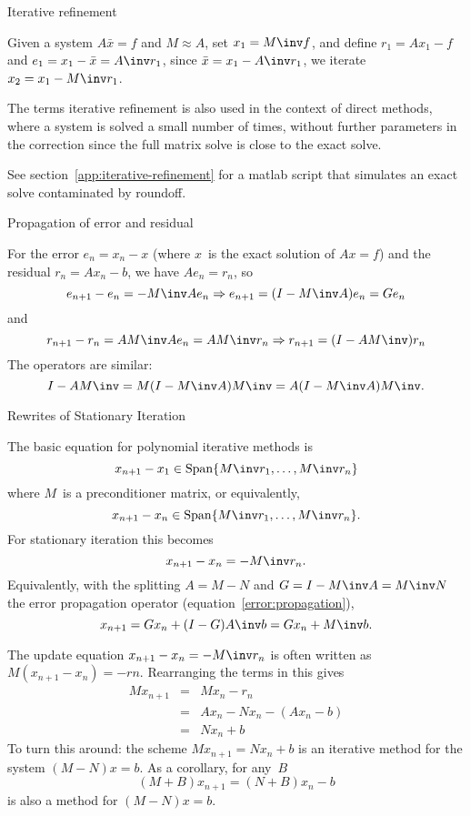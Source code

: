  {Iterative refinement}

Given a system $A\bar x=f$ and $M\approx A$,
set $x_1=M\inv f$, and define $r_1=Ax_1-f$ and $e_1=x_1-\bar x=A\inv r_1$,
since $\bar x=x_1-A\inv r_1$, we iterate $x_2=x_1-M\inv r_1$.

The terms iterative refinement is also used in the context of direct 
methods, where a system is solved a small number of times,
without further parameters in the correction since the full matrix
solve is close to the exact solve.

\begin{notes}
See section~\ref{app:iterative-refinement} for a matlab script that simulates 
an exact solve contaminated by roundoff.
\end{notes}

 {Propagation of error and residual}

For the error $e_n=x_n-x$ (where $x$~is the exact
solution of $Ax=f$) and the residual $r_n=Ax_n-b$,
we have $Ae_n=r_n$, so
\begin{equation}
	e_{n+1}-e_n=-M\inv Ae_n \Rightarrow e_{n+1}=(I-M\inv A)e_n=Ge_n
	\label{error:propagation}\end{equation}
and
\begin{equation}
	r_{n+1}-r_n=AM\inv Ae_n=AM\inv r_n \Rightarrow r_{n+1}=(I-AM\inv)r_n
	\label{residual:propagation}\end{equation}
The operators are similar:
\[ I-AM\inv = M(I-M\inv A)M\inv = A(I-M\inv A)M\inv. \]

 {Rewrites of Stationary Iteration}

The basic equation for polynomial iterative methods is
\[ x_{n+1}-x_1\in {\rm Span}\{M\inv r_1,\ldots,M\inv r_n\} \]
where $M$~is a preconditioner matrix, or equivalently,
\[ x_{n+1}-x_n\in {\rm Span}\{M\inv r_1,\ldots,M\inv r_n\}. \]
For stationary iteration this becomes
\[ x_{n+1}-x_n=-M\inv r_n. \]
Equivalently, with the splitting $A=M-N$ and
$G=I-M\inv A=M\inv N$ the error propagation operator 
(equation~\ref{error:propagation}),
\[ x_{n+1}=Gx_n+(I-G)A\inv b=Gx_n+M\inv b.\]

The update equation $x_{n+1}-x_n=-M\inv r_n$ is often written as
$M(x_{n+1}-x_n)=-rn$. Rearranging the terms in this gives
\begin{eqnarray*}
 Mx_{n+1}&=&Mx_n-r_n\\
         &=&Ax_n-Nx_n-(Ax_n-b)\\
         &=&Nx_n+b
\end{eqnarray*}
To turn this around: the scheme $Mx_{n+1}=Nx_n+b$ is an iterative
method for the system $(M-N)x=b$. As a corollary, for any~$B$
\[ (M+B)x_{n+1}=(N+B)x_n-b \] is also a method for $(M-N)x=b$.


